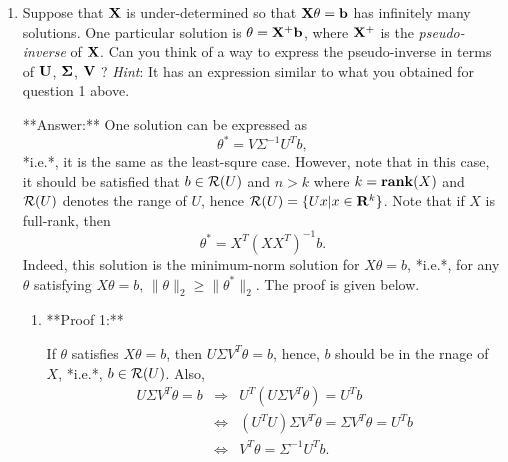 \begin{enumerate}
\item Suppose that $\bf{X}$ is under-determined so that $\bf{X} \bf{\theta} = \bf{b}$ has infinitely many solutions. One particular solution is ${\bf{\theta}} = {\bf{X}}^{+} {\bf{b}}$, where ${\bf{X}}^{+}$ is the \emph{pseudo-inverse} of ${\bf{X}}$. Can you think of a way to express the pseudo-inverse in terms of $\bf{U}$, $\bf{\Sigma}$, $\bf{V}$ ? \emph{Hint}: It has an expression similar to what you obtained for question 1 above.

**Answer:** One solution can be expressed as
\begin{equation}
\theta^\ast = V\Sigma^{-1}U^Tb,
\end{equation}
*i.e.*, it is the same as the least-squre case. However, note that in this case, it should be satisfied that $
b\in\mathcal{R}(U)$ and $n>k$ where $k=\mathbf{rank}(X)$ and $\mathcal{R}(U)$ denotes the range of $U$, hence $\mathcal{R}(U) = \{Ux|x\in\mathbf{R}^k\}$. Note that if $X$ is full-rank, then
\begin{equation}
\theta^\ast = X^T(XX^T)^{-1} b.
\end{equation}
Indeed, this solution is the minimum-norm solution for $X\theta=b$,
*i.e.*, for any $\theta$ satisfying $X\theta = b$, $\|\theta\|_2 \geq \|\theta^\ast\|_2$. The proof is given below.

\begin{solution}
\begin{enumerate}
\item


**Proof 1:**

If $\theta$ satisfies $X\theta=b$, then $U\Sigma V^T \theta = b$, 
hence, $b$ should be in the rnage of $X$, *i.e.*, $b\in\mathcal{R}(U)$.
Also,
\begin{eqnarray*}
U\Sigma V^T \theta = b
&\Rightarrow&
U^T(U\Sigma V^T \theta) = U^Tb
\\
&\Leftrightarrow&
(U^TU)\Sigma V^T \theta = \Sigma V^T \theta = U^Tb
\\
&\Leftrightarrow&
V^T \theta = \Sigma^{-1} U^Tb.
\end{eqnarray*}


\end{enumerate}
\end{solution}
\end{enumerate}
